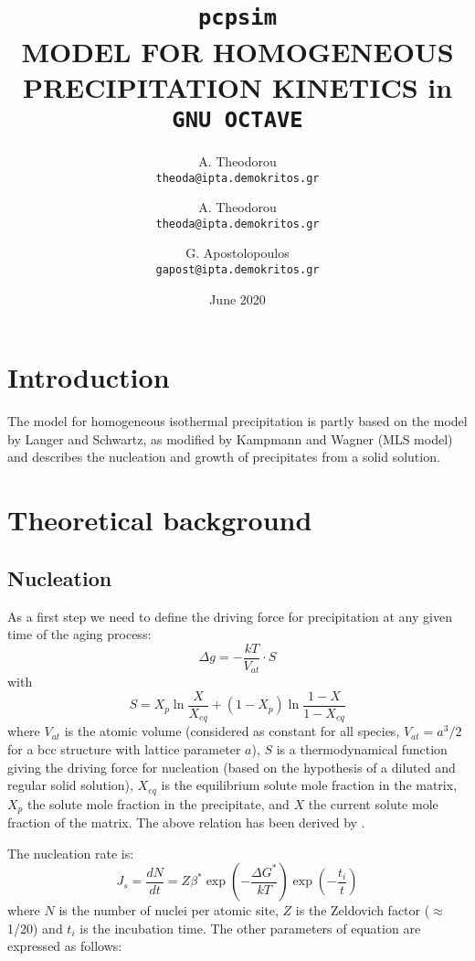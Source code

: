 \documentclass[12pt,a4paper]{article}
\author{
  A. Theodorou\\
  \texttt{theoda@ipta.demokritos.gr}
}
\author{
  A. Theodorou\\
  \texttt{theoda@ipta.demokritos.gr}
  \and
  G. Apostolopoulos\\
  \texttt{gapost@ipta.demokritos.gr}
}
\date{June 2020}
\title{\texttt{pcpsim} \\ 
MODEL FOR HOMOGENEOUS PRECIPITATION KINETICS in \texttt{GNU OCTAVE}
}
\begin{document}
\maketitle

\section{Introduction}
The model for homogeneous isothermal precipitation is partly based on the model by Langer and Schwartz, as modified by Kampmann and Wagner (MLS model) and describes the nucleation and growth of  precipitates from a solid solution.


\section{Theoretical background}

\subsection{Nucleation}

As a first step we need to define the driving force for precipitation at any given time of the aging process: 
\begin{equation}
\Delta g = - \frac{kT}{V_{at}} \cdot S 
\end{equation}
with
\begin{equation}
S =  X_p \ln\frac{X}{X_{eq}} + (1 - X_p) \ln\frac{1 - X}{1-X_{eq}} 
\end{equation}
where $V_{at}$ is the atomic volume (considered as constant for all species, $V_{at}=a^3/2$ for a bcc structure with lattice parameter $a$), $S$ is a thermodynamical function giving the driving force for nucleation (based
on the hypothesis of a diluted and regular solid solution), $X_{eq}$ is the equilibrium solute mole fraction in the matrix, $X_p$ the solute mole fraction in the precipitate, and $X$ the current solute mole fraction of the matrix. The above relation has been derived by \citet{Aaronson-1970-Thevolumefreeener}.

The nucleation rate is:
\begin{equation}
\label{eq:nucleation}
J_s = \frac{d N}{d t} = Z \beta^* \exp(-\frac{\Delta G^*}{kT}) \exp(-\frac{t_i}{t})
\end{equation}
where $N$ is the number of nuclei per atomic site, $Z$ is the Zeldovich factor ($\approx$ 1/20) and $t_i$ is the incubation time. The other parameters of equation are expressed as follows:
\end{document}
